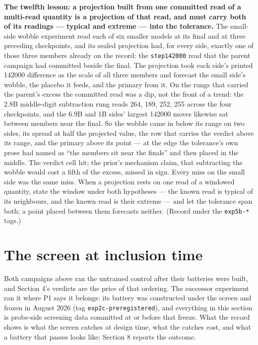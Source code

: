 \textbf{The twelfth lesson: a projection built from one committed read of a
multi-read quantity is a projection of that read, and must carry both
of its readings — typical and extreme — into the tolerance.} The
small-side wobble experiment read each of six smaller models at its
final and at three preceding checkpoints, and its sealed projection
had, for every side, exactly one of those three members already on the
record: the \texttt{step142000} read that the parent campaign had committed
beside the final. The projection took each side's printed 142000
difference as the scale of all three members and forecast the small
side's wobble, the placebo it feeds, and the primary from it. On the
rungs that carried the parent's excess the committed read was a dip,
not the front of a trend: the 2.8B middle-digit subtraction rung reads
264, 189, 252, 255 across the four checkpoints, and the 6.9B and 1B
sides' largest 142000 moves likewise sat between members near the
final. So the wobble came in below its range on two sides, its spread
at half the projected value, the row that carries the verdict above
its range, and the primary above its point — at the edge the
tolerance's own prose had named as ``the members sit near the finals''
and then placed in the middle. The verdict cell hit; the prior's
mechanism claim, that subtracting the wobble would cost a fifth of the
excess, missed in sign. Every miss on the small side was the same miss.
When a projection rests on one read of a windowed quantity, state the
window under both hypotheses — the known read is typical of its
neighbours, and the known read is their extreme — and let the
tolerance span both; a point placed between them forecasts neither.
(Record under the \texttt{exp5b-*} tags.)

\section{The screen at inclusion time}\label{the-screen-at-inclusion-time}

Both campaigns above ran the untrained control after their batteries
were built, and Section 4's verdicts are the price of that ordering.
The successor experiment ran it where P1 says it belongs: its battery
was constructed under the screen and frozen in August 2026 (tag
\texttt{exp2c-preregistered}), and everything in this section is probe-side
screening data committed at or before that freeze. What the record
shows is what the screen catches at design time, what the catches
cost, and what a battery that passes looks like; Section 8 reports
the outcome.

